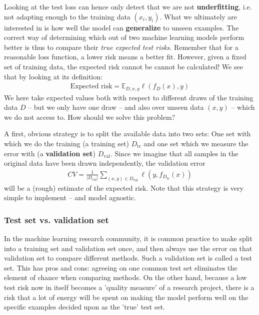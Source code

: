 \documentclass{article}
\newcommand{\tr}{\mathrm{tr}}
\newcommand{\abs}[1]{\vert #1 \vert}
\begin{document}
Looking at the test loss can hence only detect that we are not \textbf{underfitting}, i.e. not adapting enough to the training data $(x_i,y_i)$.  What we ultimately are interested in is how well the model can \textbf{generalize} to unseen examples. The correct way of determining which out of two machine learning models perform better is thus to compare their \emph{true expected test risks}. Remember that for a reasonable loss function, a lower risk means a better fit. However, given a fixed set of training data, the expected risk cannot be cannot be calculated! We see that by looking at its definition:
\begin{align*}
    \text{Expected risk} = \mathbb{E}_{D,x,y} \ell(f_D(x),y)
\end{align*}
We here take expected values both with respect to different draws of the training data $D$ -- but we only have one draw -- and also over unseen data $(x,y)$ -- which we do not access to. How should we solve this problem?

A first, obvious strategy is to split the available data into two sets: One set with which we do the training (a training set) $D_{\mathrm{tr}}$ and one set which we measure the error with (a \textbf{validation set}) $D_{\mathrm{val}}$. Since we imagine that all samples in the original data have been drawn independently, the validation error 
\begin{align*}
    CV = \frac{1}{\abs{D_\mathrm{val}}} \sum_{(x,y) \in D_\mathrm{val}} \ell(y,f_{D_\tr}(x))
\end{align*}
will be a (rough) estimate of the expected risk. Note that this strategy is very simple to implement -- and model agnostic.

\subsubsection{Test set vs. validation set} In the machine learning research community, it is common practice to make split into a training set and validation set once, and then always use the error on that validation set to compare different methods. Such a validation set is called a test set. This has pros and cons: agreeing on one common test set eliminates the element of chance when comparing methods. On the other hand, because a low test risk now in itself becomes a 'quality measure' of a research project, there is a risk that a lot of energy will be spent on making the model perform well on the specific examples decided upon as the 'true' test set. 
\end{document}
